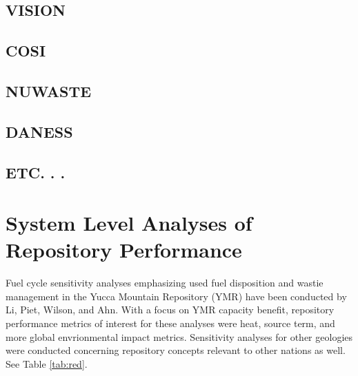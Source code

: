 \subsection{VISION}

\subsection{COSI}

\subsection{NUWASTE}

\subsection{DANESS}

\subsection{ETC. . . }




\section{System Level Analyses of Repository Performance} 

Fuel cycle sensitivity analyses emphasizing used fuel disposition and wastie management in the Yucca 
Mountain Repository (YMR) have been conducted by Li, Piet, Wilson, and Ahn. With a focus on YMR 
capacity benefit, repository performance metrics of interest for these analyses were heat, source 
term, and more global envrionmental impact metrics. Sensitivity analyses for other geologies were 
conducted concerning repository concepts relevant to other nations as well. See Table \ref{tab:red}.









